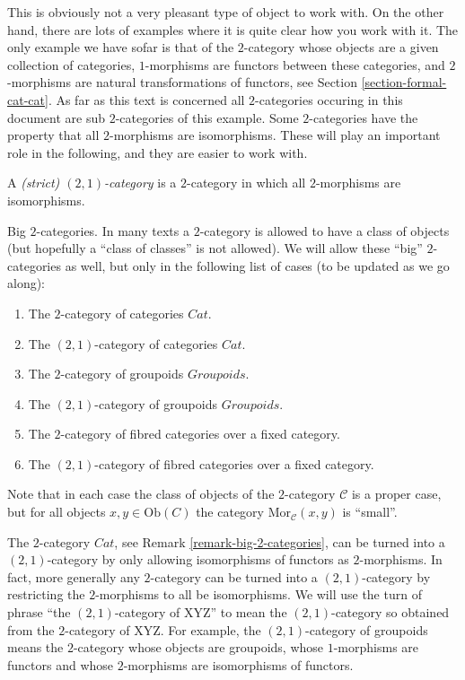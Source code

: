 \noindent
This is obviously not a very pleasant type of object to work with.
On the other hand, there are lots of examples where it is quite clear
how you work with it. The only example we have sofar is that of
the $2$-category whose objects are a given collection of categories,
$1$-morphisms are functors between these categories,
and $2$-morphisms are natural transformations of functors, see
Section \ref{section-formal-cat-cat}.
As far as this text is concerned
all $2$-categories occuring in this document are sub $2$-categories
of this example. Some $2$-categories have the property that all $2$-morphisms
are isomorphisms. These will play an important role in the following,
and they are easier to work with.

\begin{definition}
\label{definition-2-1-category}
A {\it (strict) $(2,1)$-category} is a $2$-category in which all
$2$-morphisms are isomorphisms.
\end{definition}

\begin{remark} 
\label{remark-big-2-categories}
Big $2$-categories.
In many texts a $2$-category is allowed to have a class of
objects (but hopefully a ``class of classes'' is not allowed).
We will allow these ``big'' $2$-categories as well, but only
in the following list of cases (to be updated as we go along):
\begin{enumerate}
\item The $2$-category of categories $\textit{Cat}$.
\item The $(2,1)$-category of categories $\textit{Cat}$.
\item The $2$-category of groupoids $\textit{Groupoids}$.
\item The $(2,1)$-category of groupoids $\textit{Groupoids}$.
\item The $2$-category of fibred categories over a fixed category.
\item The $(2,1)$-category of fibred categories over a fixed category.
\end{enumerate}
Note that in each case the class of objects of the $2$-category
$\mathcal{C}$ is a proper case, but for all objects $x,y \in \text{Ob}(C)$
the category $\text{Mor}_{\mathcal{C}}(x, y)$ is ``small''.
\end{remark}

\begin{example}
\label{example-2-1-category-of-categories}
The $2$-category $\textit{Cat}$,
see Remark \ref{remark-big-2-categories}, can be turned into a
$(2,1)$-category by only allowing isomorphisms of functors
as $2$-morphisms. In fact, more generally any $2$-category
can be turned into a $(2,1)$-category by restricting
the $2$-morphisms to all be isomorphisms. We will use the turn of phrase
``the $(2,1)$-category of XYZ'' to mean the $(2,1)$-category
so obtained from the $2$-category of XYZ. For example,
the $(2,1)$-category of groupoids means the
$2$-category whose objects are groupoids, whose
$1$-morphisms are functors and whose $2$-morphisms are
isomorphisms of functors.
\end{example}

